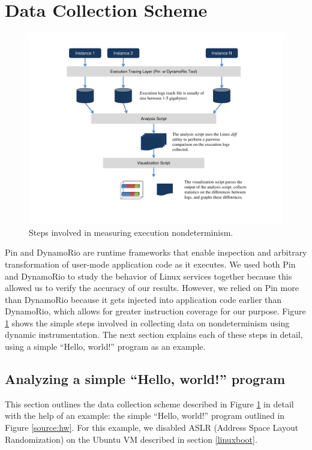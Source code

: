 \section{Data Collection Scheme} \label{datacollection}
\begin{figure}[h]
  \center
  \includegraphics[width=1.0\textwidth, trim=1cm 1cm 1cm 1cm]
                  {naivedatacollection.pdf}
  \caption[Steps involved in measuring execution nondeterminism]%
  {Steps involved in measuring execution nondeterminism.}
  \label{data:naive}
\end{figure}

Pin and DynamoRio are runtime frameworks that enable inspection
and arbitrary transformation of user-mode application code as it executes.
We used both Pin and DynamoRio to study the behavior
of Linux services together because this allowed us to verify
the accuracy of our results. However, we relied on Pin more 
than DynamoRio because it gets injected into application code
earlier than DynamoRio, which allows for greater
instruction coverage for our purpose.  Figure \ref{data:naive} shows the simple steps involved
in collecting data on nondeterminism using
dynamic instrumentation. The next section 
explains each of these steps in detail, 
using a simple ``Hello, world!'' program as an example.

\subsection{Analyzing a simple ``Hello, world!'' program}
This section outlines the data collection scheme
described in Figure \ref{data:naive} in detail with the help
of an example:  the simple ``Hello, world!'' program
outlined in Figure \ref{source:hw}.
For this example, we disabled ASLR (Address Space Layout
Randomization) on the Ubuntu VM described in section \ref{linuxboot}. \newline

